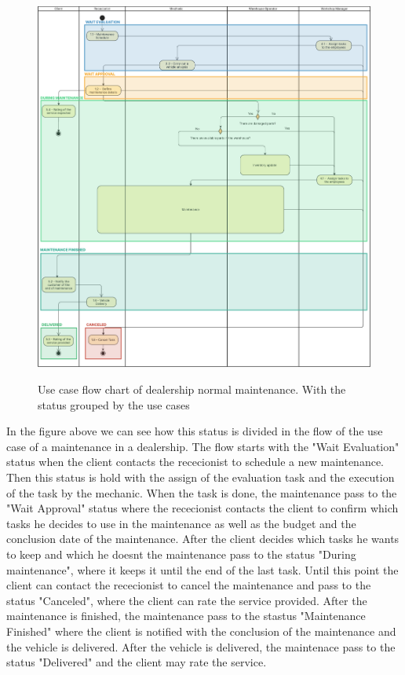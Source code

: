 \begin{figure}[h]
  \caption{Use case flow chart of dealership normal maintenance. With the status grouped by the use cases}
  \centering
  \includegraphics[width=\textwidth]{figs/Status/Maintenance/UseCaseStatus}
  \label{fig:figure2}
\end{figure}

In the figure above we can see how this status is divided in the flow of the use case of a maintenance in a dealership.
The flow starts with the "Wait Evaluation" status when the client contacts the rececionist to schedule a new maintenance. Then this status is hold with the assign of the evaluation task and the execution of the task by the mechanic.
When the task is done, the maintenance pass to the "Wait Approval" status where the rececionist contacts the client to confirm which tasks he decides to use in the maintenance as well as the budget and the conclusion date of the maintenance.
After the client decides which tasks he wants to keep and which he doesnt the maintenance pass to the status "During maintenance", where it keeps it until the end of the last task. Until this point the client can contact the rececionist to cancel the maintenance and pass to the status "Canceled", where the client can rate the service provided.
After the maintenance is finished, the maintenance pass to the stastus "Maintenance Finished" where the client is notified with the conclusion of the maintenance and the vehicle is delivered. After the vehicle is delivered, the maintenace pass to the status "Delivered" and the client may rate the service.


